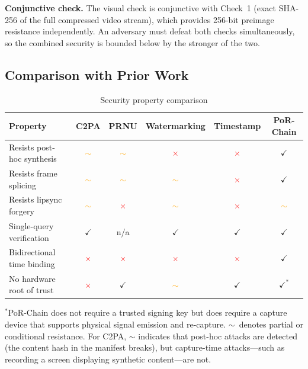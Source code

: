 \documentclass[11pt]{article}
\begin{document}
\textbf{Conjunctive check.}  The visual check is conjunctive with Check~1
(exact SHA-256 of the full compressed video stream), which provides 256-bit
preimage resistance independently.  An adversary must defeat both checks
simultaneously, so the combined security is bounded below by the stronger of
the two.

\subsection{Comparison with Prior Work}

\begin{table}[h]
\centering
\caption{Security property comparison}
\label{tab:comparison}
\begin{tabular}{lccccc}
\toprule
\textbf{Property} & \textbf{C2PA} & \textbf{PRNU} & \textbf{Watermarking}
  & \textbf{Timestamp} & \textbf{PoR-Chain} \\
\midrule
Resists post-hoc synthesis    & \textcolor{orange}{$\sim$} & \textcolor{orange}{$\sim$} & \textcolor{red}{$\times$}    & \textcolor{red}{$\times$} & \textcolor{green!60!black}{$\checkmark$} \\
Resists frame splicing        & \textcolor{orange}{$\sim$} & \textcolor{orange}{$\sim$} & \textcolor{orange}{$\sim$}  & \textcolor{red}{$\times$} & \textcolor{green!60!black}{$\checkmark$} \\
Resists lipsync forgery       & \textcolor{orange}{$\sim$} & \textcolor{red}{$\times$}  & \textcolor{orange}{$\sim$}  & \textcolor{red}{$\times$} & \textcolor{orange}{$\sim$} \\
Single-query verification     & \textcolor{green!60!black}{$\checkmark$} & n/a & \textcolor{green!60!black}{$\checkmark$} & \textcolor{green!60!black}{$\checkmark$} & \textcolor{green!60!black}{$\checkmark$} \\
Bidirectional time binding    & \textcolor{red}{$\times$} & \textcolor{red}{$\times$}  & \textcolor{red}{$\times$}   & \textcolor{red}{$\times$} & \textcolor{green!60!black}{$\checkmark$} \\
No hardware root of trust     & \textcolor{red}{$\times$} & \textcolor{green!60!black}{$\checkmark$} & \textcolor{orange}{$\sim$} & \textcolor{green!60!black}{$\checkmark$} & \textcolor{green!60!black}{$\checkmark^*$} \\
\bottomrule
\end{tabular}
\end{table}

\noindent$^*$PoR-Chain does not require a trusted signing key but does require a capture
device that supports physical signal emission and re-capture. $\sim$~denotes partial
or conditional resistance. For C2PA, $\sim$ indicates that post-hoc attacks are
detected (the content hash in the manifest breaks), but capture-time attacks---such
as recording a screen displaying synthetic content---are not.
\end{document}
